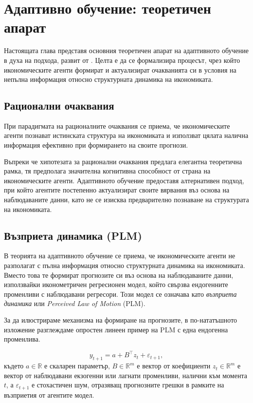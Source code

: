 \chapter{Адаптивно обучение: теоретичен апарат}

Настоящата глава представя основния теоретичен апарат на адаптивното обучение в духа на подхода, развит от \textcite{GeorgeEvans_2001}. Целта е да се формализира процесът, чрез който икономическите агенти формират и актуализират очакванията си в условия на непълна информация относно структурната динамика на икономиката.


\section{Рационални очаквания}

При парадигмата на рационалните очаквания се приема, че икономическите агенти познават истинската структура на икономиката и използват цялата налична информация ефективно при формирането на своите прогнози.

Въпреки че хипотезата за рационални очаквания предлага елегантна теоретична рамка, тя предполага значителна когнитивна способност от страна на икономическите агенти. Адаптивното обучение предоставя алтернативен подход, при който агентите постепенно актуализират своите вярвания въз основа на наблюдаваните данни, като не се изисква предварително познаване на структурата на икономиката.

\section{Възприета динамика (PLM)}

В теорията на адаптивното обучение се приема, че икономическите агенти не разполагат с пълна информация относно структурната динамика на икономиката. Вместо това те формират прогнозите си въз основа на наблюдаваните данни, използвайки иконометричен регресионен модел, който
свързва ендогенните променливи с наблюдавани регресори. Този модел се означава като \emph{възприета динамика} или \emph{Perceived Law of Motion} (PLM).

За да илюстрираме механизма на формиране на прогнозите, в по-нататъшното изложение разглеждаме опростен линеен пример на PLM с една ендогенна променлива.

\begin{equation}
y_{t+1} = a + B^\top z_{t} + \varepsilon_{t+1},
\label{eq:plm}
\end{equation}
където $a \in \mathbb{R}$ е скаларен параметър,
$B \in \mathbb{R}^{m}$ е вектор от коефициенти
$z_{t} \in \mathbb{R}^m$ е вектор от наблюдавани екзогенни или лагнати
променливи, налични към момента $t$, а $\varepsilon_{t+1}$ е стохастичен шум, отразяващ прогнозните грешки в рамките на възприетия от агентите модел.

